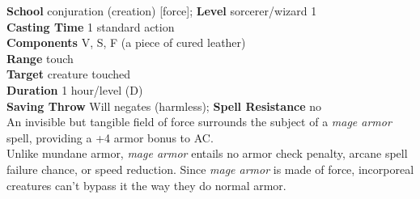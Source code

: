 \textbf{School} conjuration (creation) [force]; \textbf{Level} sorcerer/wizard 1\\
\textbf{Casting Time} 1 standard action\\
\textbf{Components} V, S, F (a piece of cured leather)\\
\textbf{Range} touch\\
\textbf{Target} creature touched\\
\textbf{Duration} 1 hour/level (D)\\
\textbf{Saving Throw }Will negates (harmless); \textbf{Spell Resistance} no\\
An invisible but tangible field of force surrounds the subject of a \textit{mage armor }spell, providing a +4 armor bonus to AC.\\
Unlike mundane armor, \textit{mage armor }entails no armor check penalty, arcane spell failure chance, or speed reduction. Since \textit{mage armor }is made of force, incorporeal creatures can't bypass it the way they do normal armor.\\
